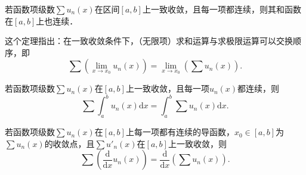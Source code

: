 \documentclass[../../main.tex]{subfiles}
\begin{document}
\begin{theorem}[连续性]\label{theorem:函数项级数连续性定理}
若函数项级数\(\sum u_n(x)\)在区间\([a, b]\)上一致收敛，且每一项都连续，则其和函数在\([a, b]\)上也连续．
\end{theorem}
\begin{note}
这个定理指出：在一致收敛条件下，（无限项）求和运算与求极限运算可以交换顺序，即
\[
\sum \left( \lim_{x \to x_0} u_n(x) \right) = \lim_{x \to x_0} \left( \sum u_n(x) \right). 
\]
\end{note}

\begin{theorem}[逐项求积]\label{theorem:函数项级数逐项求积定理}
若函数项级数\(\sum u_n(x)\)在\([a, b]\)上一致收敛，且每一项\(u_n(x)\)都连续，则
\[
\sum \int_a^b u_n(x) \mathrm{d}x = \int_a^b \sum u_n(x) \mathrm{d}x. 
\]
\end{theorem}

\begin{theorem}[逐项求导]\label{theorem:级数逐项求导定理}
若函数项级数\(\sum u_n(x)\)在\([a, b]\)上每一项都有连续的导函数，\(x_0 \in [a, b]\)为\(\sum u_n(x)\)的收敛点，且\(\sum u'_n(x)\)在\([a, b]\)上一致收敛，则
\[
\sum \left( \frac{\mathrm{d}}{\mathrm{d}x} u_n(x) \right) = \frac{\mathrm{d}}{\mathrm{d}x} \left( \sum u_n(x) \right). 
\]
\end{theorem}
\end{document}
